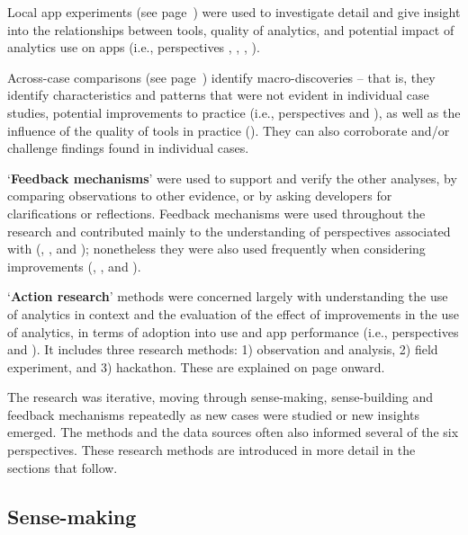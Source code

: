 Local app experiments (see page~\pageref{local-app-experiments-research-method}) were used to investigate detail and give insight into the relationships between tools, quality of analytics, and potential impact of analytics use on apps (i.e., perspectives \uartefacts, \utools, \iartefacts, \itools).

Across-case comparisons (see page~\pageref{across-case-comparisons-research-method}) identify macro-discoveries -- that is, they identify characteristics and patterns that were not evident in individual case studies, potential improvements to practice (i.e., perspectives \uuse and \iuse), as well as the influence of the quality of tools in practice (\itools). They can also corroborate and/or challenge findings found in individual cases.


`\textbf{Feedback mechanisms}' were used to support and verify the other analyses, by comparing observations to other evidence, or by asking developers for clarifications or reflections. Feedback mechanisms were used throughout the research and contributed mainly to the understanding of perspectives associated with (\uuse, \uartefacts, and \utools); nonetheless they were also used frequently when considering improvements (\iuse, \iartefacts, and \itools). 

`\textbf{Action research}' methods were concerned largely with understanding the use of analytics in context and the evaluation of the effect of improvements in the use of analytics, in terms of adoption into use and app performance (i.e., perspectives \iuse and \iartefacts). It includes three research methods: 1) observation and analysis, 2) field experiment, and 3) hackathon. These are explained on page \pageref{section-action-research-method} onward. 

The research was iterative, moving through sense-making, sense-building and feedback mechanisms repeatedly as new cases were studied or new insights emerged.  The methods and the data sources often also informed several of the six perspectives.  These research methods are introduced in more detail in the sections that follow.

\subsection{Sense-making}

